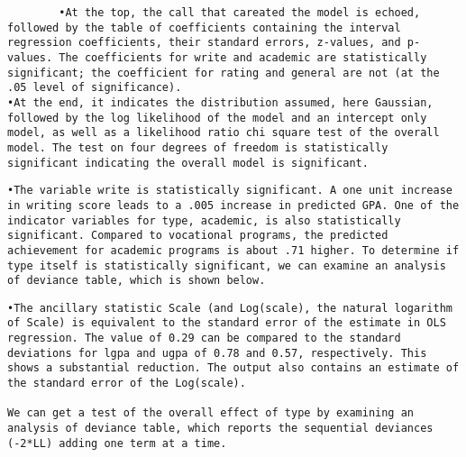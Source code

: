 \begin{frame}[fragile]
	\large
	\begin{framed}
		\begin{verbatim}
		•At the top, the call that careated the model is echoed, followed by the table of coefficients containing the interval regression coefficients, their standard errors, z-values, and p-values. The coefficients for write and academic are statistically significant; the coefficient for rating and general are not (at the .05 level of significance).
•At the end, it indicates the distribution assumed, here Gaussian, followed by the log likelihood of the model and an intercept only model, as well as a likelihood ratio chi square test of the overall model. The test on four degrees of freedom is statistically significant indicating the overall model is significant. 
\end{verbatim}
\end{framed}
\end{frame}
\begin{frame}[fragile]
	\large
	\begin{framed}
		\begin{verbatim}
•The variable write is statistically significant. A one unit increase in writing score leads to a .005 increase in predicted GPA. One of the indicator variables for type, academic, is also statistically significant. Compared to vocational programs, the predicted achievement for academic programs is about .71 higher. To determine if type itself is statistically significant, we can examine an analysis of deviance table, which is shown below.
\end{verbatim}
\end{framed}
\end{frame}
\begin{frame}[fragile]
	\large
	\begin{framed}
		\begin{verbatim}
•The ancillary statistic Scale (and Log(scale), the natural logarithm of Scale) is equivalent to the standard error of the estimate in OLS regression. The value of 0.29 can be compared to the standard deviations for lgpa and ugpa of 0.78 and 0.57, respectively. This shows a substantial reduction. The output also contains an estimate of the standard error of the Log(scale).
 
We can get a test of the overall effect of type by examining an analysis of deviance table, which reports the sequential deviances (-2*LL) adding one term at a time.
 
\end{verbatim}
\end{framed}
\end{frame}
